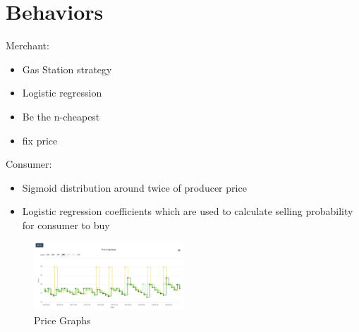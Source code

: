 \section{Behaviors}
\label{sec:Behaviors}

Merchant:
\begin{itemize}
\item Gas Station strategy
\item Logistic regression 
\item Be the n-cheapest
\item fix price
\end{itemize}

Consumer:
\begin{itemize}
\item Sigmoid distribution around twice of producer price
\item Logistic regression coefficients which are used to calculate selling probability for consumer to buy
\end{itemize}

%
\begin{figure}[h]
    \centering
    \includegraphics[width=0.5\textwidth]{images/price_graphs_v2.png}
    \caption{Price Graphs}
    \label{fig:price_graphs_v2}
\end{figure}
%